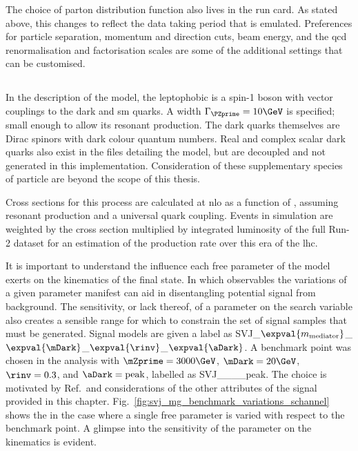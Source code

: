 The choice of parton distribution function also lives in the run card. As stated above, this changes to reflect the data taking period that is emulated. Preferences for particle separation, momentum and direction cuts, beam energy, and the \acrshort{qcd} renormalisation and factorisation scales are some of the additional settings that can be customised.




\subsection{\texorpdfstring{\schannel}{s-channel}}
\label{subsec:svj_signal_madgraph_schannel}

In the description of the \schannel model, the leptophobic \PZprime is a spin-1 boson with vector couplings to the dark and \acrshort{sm} quarks. A width $\Gamma_{\PZprime} = \text{10}\GeV$ is specified; small enough to allow its resonant production. The dark quarks themselves are Dirac spinors with dark colour quantum numbers. Real and complex scalar dark quarks also exist in the files detailing the model, but are decoupled and not generated in this implementation. Consideration of these supplementary species of particle are beyond the scope of this thesis.

Cross sections for this process are calculated at \acrshort{nlo} as a function of \mZprime, assuming resonant production and a universal quark coupling. Events in simulation are weighted by the cross section multiplied by integrated luminosity of the full Run-2 dataset for an estimation of the production rate over this era of the \acrshort{lhc}. %

It is important to understand the influence each free parameter of the model exerts on the kinematics of the final state. In which observables the variations of a given parameter manifest can aid in disentangling potential signal from background. The sensitivity, or lack thereof, of a parameter on the search variable also creates a sensible range for which to constrain the set of signal samples that must be generated. Signal models are given a label as SVJ\_\-$\expval{m_{\mathrm{mediator}}}$\_\-$\expval{\mDark}$\_\-$\expval{\rinv}$\_\-$\expval{\aDark}$. A benchmark point was chosen in the analysis with $\mZprime = \text{3000}\GeV$, $\mDark = \text{20}\GeV$, $\rinv = \text{0.3}$, and $\aDark = \text{peak}$, labelled as SVJ\_\_\_\_\-peak. The choice is motivated by Ref.~and considerations of the other attributes of the signal provided in this chapter. Fig.~\ref{fig:svj_mg_benchmark_variations_schannel} shows the \mT in the case where a single free parameter is varied with respect to the benchmark point. A glimpse into the sensitivity of the parameter on the kinematics is evident.

